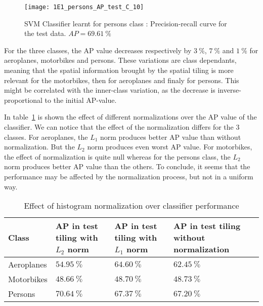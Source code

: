 \documentclass{article}
\begin{document}
\begin{figure}[ht!]
	\centering
	\texttt{[image: 1E1\_persons\_AP\_test\_C\_10]}
	\caption{SVM Classifier learnt for persons class : Precision-recall curve for the test data. \(AP = 69.61~\%\)}
	\label{fig_1E1_persons}
\end{figure}

For the three classes, the AP value decreases respectively by \(3~\%\),  \(7~\%\) and \(1~\%\) for aeroplanes, motorbikes and persons. These variations are class dependants, meaning that the spatial information brought by the spatial tiling is more relevant for the motorbikes, then for aeroplanes and finaly for persons. This might be correlated with the inner-class variation, as the decrease is inverse-proportional to the initial AP-value.

\clearpage


In table~\ref{tab_normalization} is shown the effect of different normalizations over the AP value of the classifier. We can notice that the effect of the normalization differs for the 3 classes. For aeroplanes, the \(L_1\) norm produces better AP value than without normalization. But the \(L_2\) norm produces even worst AP value. For motorbikes, the effect of normalization is quite null whereas for the persons class, the \(L_2\) norm produces better AP value than the others. To conclude, it seems that the performance may be affected by the normalization process, but not in a uniform way.

\begin{table}[ht!]
	\centering
	\begin{tabular}{|l | p{3.5cm} | p{3.5cm}| p{3.5cm}|}
		\hline
		Class      & AP in test tiling with \(L_2\) norm & AP in test tiling with \(L_1\) norm & AP in test tiling without normalization \\\hline\hline
		Aeroplanes & \(54.95~\%\)                        & \(64.60~\%\)                        & \(62.45~\%\)                            \\\hline
		Motorbikes & \(48.66~\%\)                        & \(48.70~\%\)                        & \(48.73~\%\)                            \\\hline
		Persons    & \(70.64~\%\)                        & \(67.37~\%\)                        & \(67.20~\%\)                            \\\hline
	\end{tabular}
	\caption{Effect of histogram normalization over classifier performance}
	\label{tab_normalization}
\end{table}
\end{document}
